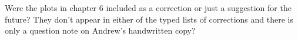 \documentclass[12pt,a4paper,pdftex]{article}
\begin{document}
Were the plots in chapter 6 included as a correction or just a suggestion for the future? They don't appear in either of the typed lists of corrections and there is only a question note on Andrew's handwritten copy?
\end{document}
